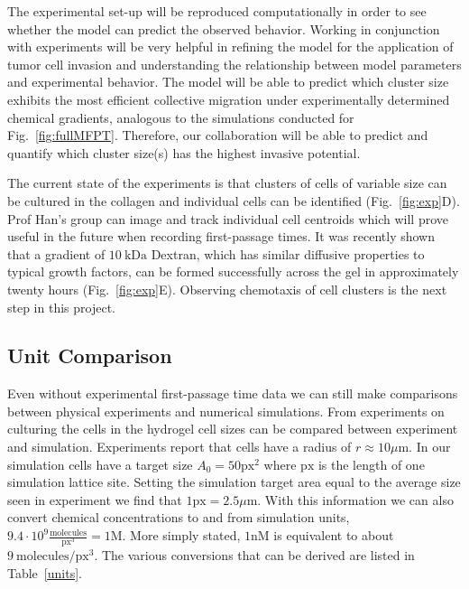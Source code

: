 \documentclass[phys,prelim]{puthesis}
\begin{document}
The experimental set-up will be reproduced computationally in order to see whether the model can predict the observed behavior. Working in conjunction with experiments will be very helpful in refining the model for the application of tumor cell invasion and understanding the relationship between model parameters and experimental behavior. The model will be able to predict which cluster size exhibits the most efficient collective migration under experimentally determined chemical gradients, analogous to the simulations conducted for Fig.\ \ref{fig:fullMFPT}. Therefore, our collaboration will be able to predict and quantify which cluster size(s) has the highest invasive potential.

The current state of the experiments is that clusters of cells of variable size can be cultured in the collagen and individual cells can be identified (Fig.\ \ref{fig:exp}D). Prof Han's group can image and track individual cell centroids which will prove useful in the future when recording first-passage times. It was recently shown that a gradient of $10 \ \text{kDa}$ Dextran, which has similar diffusive properties to typical growth factors, can be formed successfully across the gel in approximately twenty hours (Fig.\ \ref{fig:exp}E). Observing chemotaxis of cell clusters is the next step in this project.

\subsection{Unit Comparison}

Even without experimental first-passage time data we can still make comparisons between physical experiments and numerical simulations. From experiments on culturing the cells in the hydrogel cell sizes can be compared between experiment and simulation. Experiments report that cells have a radius of $r \approx 10 \mu\text{m}$. In our simulation cells have a target size $A_0 = 50\text{px}^2$ where $\text{px}$ is the length of one simulation lattice site. Setting the simulation target area equal to the average size seen in experiment we find that $1\text{px} = 2.5\mu\text{m}$. With this information we can also convert chemical concentrations to and from simulation units, $9.4\cdot 10^9 \frac{\text{molecules}}{\text{px}^3} = 1 \text{M}$. More simply stated, $1 \text{nM}$
is equivalent to about $9 \ \text{molecules}/\text{px}^3$.
The various conversions that can be derived are listed in Table\ \ref{units}.
\end{document}
